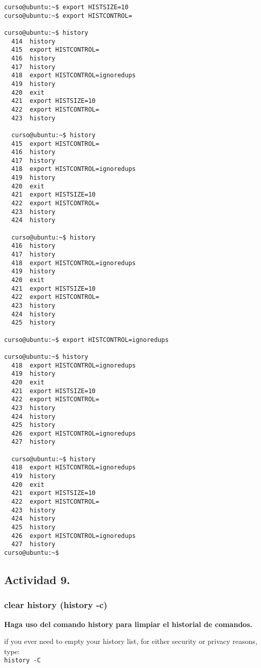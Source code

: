 \documentclass[a4paper,11pt,spanish]{article} %
\newenvironment{myscriptlisting}
{\begin{list}{}{\setlength{\leftmargin}{1em}}\item\scriptsize\bfseries}
{\end{list}}
\begin{document}
\begin{myscriptlisting}
 \begin{verbatim}
curso@ubuntu:~$ export HISTSIZE=10
curso@ubuntu:~$ export HISTCONTROL=

curso@ubuntu:~$ history
  414  history
  415  export HISTCONTROL=
  416  history
  417  history
  418  export HISTCONTROL=ignoredups
  419  history
  420  exit
  421  export HISTSIZE=10
  422  export HISTCONTROL=
  423  history

  curso@ubuntu:~$ history
  415  export HISTCONTROL=
  416  history
  417  history
  418  export HISTCONTROL=ignoredups
  419  history
  420  exit
  421  export HISTSIZE=10
  422  export HISTCONTROL=
  423  history
  424  history

  curso@ubuntu:~$ history
  416  history
  417  history
  418  export HISTCONTROL=ignoredups
  419  history
  420  exit
  421  export HISTSIZE=10
  422  export HISTCONTROL=
  423  history
  424  history
  425  history

curso@ubuntu:~$ export HISTCONTROL=ignoredups

curso@ubuntu:~$ history
  418  export HISTCONTROL=ignoredups
  419  history
  420  exit
  421  export HISTSIZE=10
  422  export HISTCONTROL=
  423  history
  424  history
  425  history
  426  export HISTCONTROL=ignoredups
  427  history

  curso@ubuntu:~$ history
  418  export HISTCONTROL=ignoredups
  419  history
  420  exit
  421  export HISTSIZE=10
  422  export HISTCONTROL=
  423  history
  424  history
  425  history
  426  export HISTCONTROL=ignoredups
  427  history
curso@ubuntu:~$ 
\end{verbatim}
\end{myscriptlisting}

\subsection{Actividad 9.}

\subsubsection{clear history (history -c)}

\textbf{Haga uso del comando history para limpiar el historial de comandos.}

if you ever need to empty your history list, for either security or privacy reasons, type:\\

\texttt{history -C}\\
\end{document}
